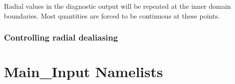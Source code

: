 \documentclass[letterpaper,11pt,english]{sphinxmanual}
\begin{document}
\begin{sphinxVerbatim}[commandchars=\\\{\}]
     
    
\end{sphinxVerbatim}

\sphinxAtStartPar
Radial values in the diagnostic output will be repeated at the inner
domain boundaries. Most quantities are forced to be continuous at these
points.


\subsection{Controlling radial dealiasing}
\label{\detokenize{doc/source/Model_Setup/grid_specification:controlling-radial-dealiasing}}

\chapter{Main\_Input Namelists}
\label{\detokenize{doc/source/Namelist_Definitions/Namelist_Variables:main-input-namelists}}\label{\detokenize{doc/source/Namelist_Definitions/Namelist_Variables:namelists}}\label{\detokenize{doc/source/Namelist_Definitions/Namelist_Variables::doc}}
\end{document}

